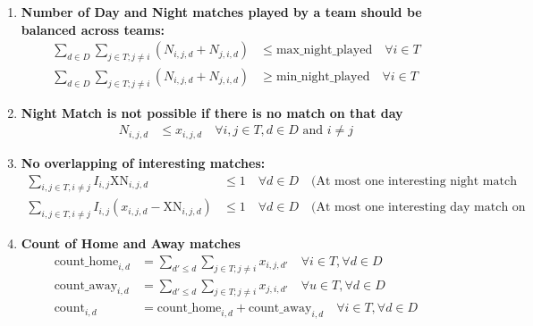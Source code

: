 \documentclass[a4paper, 12pt]{article}
\begin{document}
\begin{enumerate}
    \item \textbf{Number of Day and Night matches played by a team should be balanced across teams:}
    \begin{align*}
        \sum_{d \in D} \sum_{j \in T; j \neq i} (N_{i,j,d} + N_{j,i,d}) &\leq \text{max\_night\_played} \quad \forall i \in T\\
        \sum_{d \in D} \sum_{j \in T; j \neq i} (N_{i,j,d} + N_{j,i,d})
        &\geq \text{min\_night\_played} \quad \forall i \in T
    \end{align*}

    \item \textbf{Night Match is not possible if there is no match on that day}
    \begin{align*}
        N_{i,j,d} &\leq x_{i,j,d} \quad \forall i,j \in T, d \in D \text{ and } i \neq j
    \end{align*}

    \item \textbf{No overlapping of interesting matches:}
    \begin{align*}
        \sum_{i,j \in T, i \neq j} I_{i,j} \text{XN}_{i,j,d} &\leq 1 \quad \forall d \in D \quad \text{(At most one interesting night match on a weekend)}\\
        \sum_{i,j \in T, i \neq j} I_{i,j} (x_{i,j,d} - \text{XN}_{i,j,d}) &\leq 1 \quad \forall d \in D \quad \text{(At most one interesting day match on a weekend)}
    \end{align*}

    \item \textbf{Count of Home and Away matches}
    \begin{align*}
        \text{count\_home}_{i,d} &= \sum_{d' \leq d} \sum_{j \in T; j \neq i} x_{i,j,d'} \quad \forall i \in T , \forall d \in D \\
        \text{count\_away}_{i,d} &= \sum_{d' \leq d} \sum_{j \in T; j \neq i} x_{j,i,d'} \quad \forall u \in T, \forall d \in D \\
        \text{count}_{i,d} &= \text{count\_home}_{i,d} + \text{count\_away}_{i,d} \quad \forall i \in T, \forall d \in D
    \end{align*}


\end{enumerate}
\end{document}
